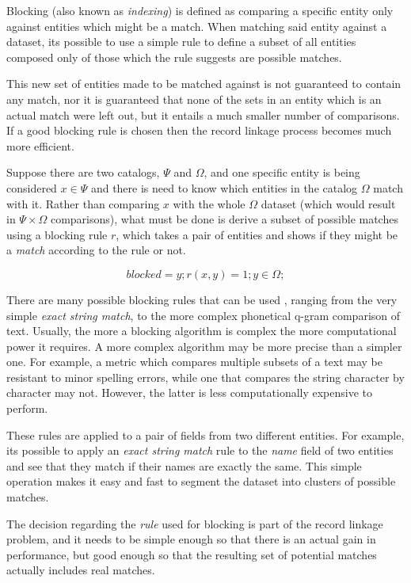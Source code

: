 \documentclass[epsfig,a4paper,11pt,titlepage,twoside,openany]{book}
\begin{document}
Blocking (also known as \textit{indexing}) is defined as comparing a specific entity only against entities which might be a match. When matching said entity against a dataset, its possible to use a simple rule to define a subset of all entities
composed only of those which the rule suggests are possible matches. 

This new set of entities made to be matched against is not guaranteed to contain any match, nor it
is guaranteed that none of the sets in an entity which is an actual match were left out, but it entails a much smaller number of comparisons. 
If a good blocking rule is chosen then the record linkage process becomes much more efficient.

Suppose there are two catalogs, $\Psi$ and $\Omega$, and one specific entity is being considered $x \in
\Psi$ and there is need to know which entities in the catalog $\Omega$ match with it.
Rather than comparing $x$ with the whole $\Omega$ dataset (which would result in
$\Psi \times \Omega$ comparisons), what must be done is derive a subset of possible matches using a
blocking rule $r$, which takes a pair of entities and shows if they might be a \textit{match} according to the rule or not.

$$
blocked = {y; r(x,y) = 1; y \in \Omega;}
$$

There are many possible blocking rules that can be used
\cite{christen12_survey_index_techn_scalab_recor_linkag_dedup}, ranging from the
very simple \textit{exact string match}, to the more complex phonetical q-gram
comparison of text. Usually, the more a blocking algorithm is complex the more computational power it requires. A more complex algorithm may be more precise than a simpler one. For example, a metric which compares multiple subsets of a text may be resistant to minor spelling errors, while one that compares the string character by character may not. However, the latter is less computationally expensive to perform.

These rules are applied to a pair of fields from two different entities. For
example, its possible to apply an \textit{exact string match} rule to the \textit{name}
field of two entities and see that they match if their names are exactly the
same. This simple operation makes it easy and fast to segment the dataset into
clusters of possible matches.

The decision regarding the \textit{rule} used for blocking is part of the record
linkage problem, and it needs to be simple enough so that there is an actual gain in performance, but good enough so that the resulting set of potential
matches actually includes real matches. 
\end{document}
